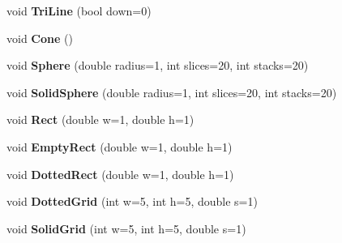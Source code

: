 \begin{DoxyCompactItemize}
\item 
\hypertarget{namespacevsr_1_1_g_l_1_1_glyph_a66d75790f087e798d6a63c14e4ef1afc}{void {\bfseries Tri\-Line} (bool down=0)}\label{namespacevsr_1_1_g_l_1_1_glyph_a66d75790f087e798d6a63c14e4ef1afc}

\item 
\hypertarget{namespacevsr_1_1_g_l_1_1_glyph_a202c81547e61ce1e6429204d97148055}{void {\bfseries Cone} ()}\label{namespacevsr_1_1_g_l_1_1_glyph_a202c81547e61ce1e6429204d97148055}

\item 
\hypertarget{namespacevsr_1_1_g_l_1_1_glyph_a204f6f9304c86de74b3d60245a68ffdc}{void {\bfseries Sphere} (double radius=1, int slices=20, int stacks=20)}\label{namespacevsr_1_1_g_l_1_1_glyph_a204f6f9304c86de74b3d60245a68ffdc}

\item 
\hypertarget{namespacevsr_1_1_g_l_1_1_glyph_afd76758ef53b650f6f6f85ba98603970}{void {\bfseries Solid\-Sphere} (double radius=1, int slices=20, int stacks=20)}\label{namespacevsr_1_1_g_l_1_1_glyph_afd76758ef53b650f6f6f85ba98603970}

\item 
\hypertarget{namespacevsr_1_1_g_l_1_1_glyph_a28fc714aeb360a21093115a46a3cf984}{void {\bfseries Rect} (double w=1, double h=1)}\label{namespacevsr_1_1_g_l_1_1_glyph_a28fc714aeb360a21093115a46a3cf984}

\item 
\hypertarget{namespacevsr_1_1_g_l_1_1_glyph_a5a671177de7f261b6807022010640bf6}{void {\bfseries Empty\-Rect} (double w=1, double h=1)}\label{namespacevsr_1_1_g_l_1_1_glyph_a5a671177de7f261b6807022010640bf6}

\item 
\hypertarget{namespacevsr_1_1_g_l_1_1_glyph_ac9b70813964b1b07c7cf57abadca87f2}{void {\bfseries Dotted\-Rect} (double w=1, double h=1)}\label{namespacevsr_1_1_g_l_1_1_glyph_ac9b70813964b1b07c7cf57abadca87f2}

\item 
\hypertarget{namespacevsr_1_1_g_l_1_1_glyph_ad9cd4cb66259a5b08b63cb507d84de4a}{void {\bfseries Dotted\-Grid} (int w=5, int h=5, double s=1)}\label{namespacevsr_1_1_g_l_1_1_glyph_ad9cd4cb66259a5b08b63cb507d84de4a}

\item 
\hypertarget{namespacevsr_1_1_g_l_1_1_glyph_a9aa7134b40d6b06c80880db33c967133}{void {\bfseries Solid\-Grid} (int w=5, int h=5, double s=1)}\label{namespacevsr_1_1_g_l_1_1_glyph_a9aa7134b40d6b06c80880db33c967133}


\end{DoxyCompactItemize}
